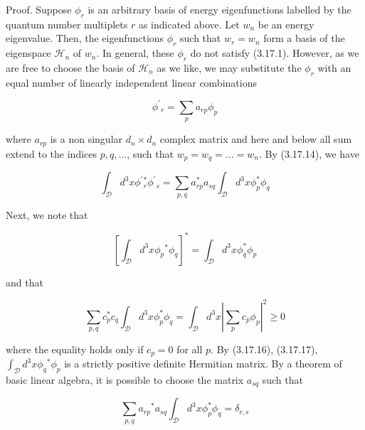 \documentclass{article}
\begin{document}
Proof. Suppose $\phi_{r}$ is an arbitrary basis of energy eigenfunctions labelled by the quantum number multiplets $r$ as indicated above. Let $w_{n}$ be an energy eigenvalue. Then, the eigenfunctions $\phi_{r}$ such that $w_{r}=w_{n}$ form a basis of the eigenspace $\mathcal{H}_{n}$ of $w_{n}$. In general, these $\phi_{r}$ do not satisfy (3.17.1). However, as we are free to choose the basis of $\mathcal{H}_{n}$ as we like, we may substitute the $\phi_{r}$ with an equal number of linearly independent linear combinations
 
\begin{equation*}
\phi^{\prime}{ }_{r}=\sum_{p} a_{r p} \phi_{p} \tag{3.17.14}
\end{equation*}
 
where $a_{r p}$ is a non singular $d_{n} \times d_{n}$ complex matrix and here and below all sum extend
to the indices $p, q, \ldots$, such that $w_{p}=w_{q}=\ldots=w_{n}$. By (3.17.14), we have
 
\begin{equation*}
\int_{\mathcal{D}} d^{3} x \phi^{\prime}{ }_{r}^{*} \phi^{\prime}{ }_{s}=\sum_{p, q} a_{r p}^{*} a_{s q} \int_{\mathcal{D}} d^{3} x \phi_{p}^{*} \phi_{q} \tag{3.17.15}
\end{equation*}
 

Next, we note that
 
\begin{equation*}
\left[\int_{\mathcal{D}} d^{3} x \phi_{p}{ }^{*} \phi_{q}\right]^{*}=\int_{\mathcal{D}} d^{3} x \phi_{q}^{*} \phi_{p} \tag{3.17.16}
\end{equation*}
 
and that
 
\begin{equation*}
\sum_{p, q} c_{p}^{*} c_{q} \int_{\mathcal{D}} d^{3} x \phi_{p}^{*} \phi_{q}=\int_{\mathcal{D}} d^{3} x\left|\sum_{p} c_{p} \phi_{p}\right|^{2} \geq 0 \tag{3.17.17}
\end{equation*}
 
where the equality holds only if $c_{p}=0$ for all $p$. By (3.17.16), (3.17.17), $\int_{\mathcal{D}} d^{3} x \phi_{q}{ }^{*} \phi_{p}$ is a strictly positive definite Hermitian matrix. By a theorem of basic linear algebra, it is possible to choose the matrix $a_{s q}$ such that
 
\begin{equation*}
\sum_{p, q} a_{r p}{ }^{*} a_{s q} \int_{\mathcal{D}} d^{3} x \phi_{p}^{*} \phi_{q}=\delta_{r, s} \tag{3.17.18}
\end{equation*}
 
\end{document}
